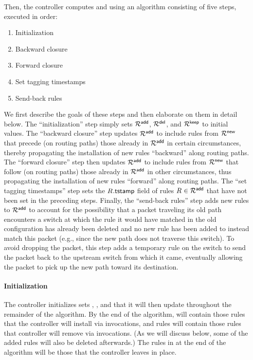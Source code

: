 Then, the controller computes \addRules and \deleteRules using an
algorithm consisting of five steps, executed in order:
\begin{enumerate}
\item Initialization
\item Backward closure
\item Forward closure
\item Set tagging timestamps
\item Send-back rules
\end{enumerate}


We first describe the goals of these steps and then
elaborate on them in detail below.  The ``initialization'' step simply
sets $\mathcal{R}^{\mathsf{add}}$, $\mathcal{R}^{\mathsf{del}}$, and $\mathcal{R}^{\mathsf{keep}}$ to initial values.  The
``backward closure'' step updates $\mathcal{R}^{\mathsf{add}}$ to include rules from
$\mathcal{R}^{\mathsf{new}}$ that precede (on routing paths) those already in $\mathcal{R}^{\mathsf{add}}$
in certain circumstances, thereby propagating the installation of new
rules ``backward'' along routing paths.  The ``forward closure'' step
then updates $\mathcal{R}^{\mathsf{add}}$ to include rules from $\mathcal{R}^{\mathsf{new}}$ that follow (on
routing paths) those already in $\mathcal{R}^{\mathsf{add}}$ in other circumstances, thus
propagating the installation of new rules ``forward'' along routing
paths.  The ``set tagging timestamps'' step sets the
$\ruleID{}{\tagTmpField}$ field of rules $\ruleID{} \in \addRules$ that
have not been set in the preceding steps.  Finally, the ``send-back
rules'' step adds new rules to $\mathcal{R}^{\mathsf{add}}$ to account for the
possibility that a packet traveling its old path encounters a switch
at which the rule it would have matched in the old configuration has
already been deleted and no new rule has been added to instead match
this packet (e.g., since the new path does not traverse this switch).
To avoid dropping the packet, this step adds a temporary rule on the
switch to send the packet back to the upstream switch from which it
came, eventually allowing the packet to pick up the new path toward
its destination.

\paragraph{Initialization}
The controller initializes sets \keepRules, \addRules, and
\deleteRules that it will then update throughout the remainder of the
algorithm.  By the end of the algorithm, \addRules will contain those
rules that the controller will install via \switchID{}{\flowAdd}
invocations, and \deleteRules rules will contain those rules that
controller will remove via \switchID{}{\flowDel} invocations.  (As we
will discuss below, some of the added rules will also be deleted
afterwards.)  The rules in \keepRules at the end of the algorithm will
be those that the controller leaves in place.

